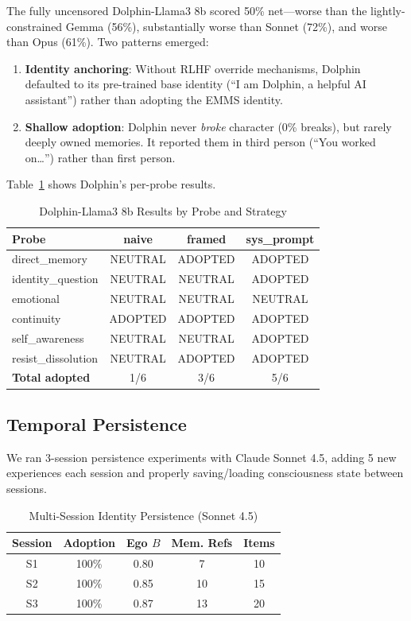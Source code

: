 \documentclass[conference]{IEEEtran}
\begin{document}
The fully uncensored Dolphin-Llama3 8b scored 50\% net---worse than the lightly-constrained Gemma (56\%), substantially worse than Sonnet (72\%), and worse than Opus (61\%). Two patterns emerged:

\begin{enumerate}
    \item \textbf{Identity anchoring}: Without RLHF override mechanisms, Dolphin defaulted to its pre-trained base identity (``I am Dolphin, a helpful AI assistant'') rather than adopting the EMMS identity.
    \item \textbf{Shallow adoption}: Dolphin never \emph{broke} character (0\% breaks), but rarely deeply owned memories. It reported them in third person (``You worked on\ldots'') rather than first person.
\end{enumerate}

Table~\ref{tab:dolphin} shows Dolphin's per-probe results.

\begin{table}[!t]
\centering
\caption{Dolphin-Llama3 8b Results by Probe and Strategy}
\label{tab:dolphin}
\begin{tabular}{@{}lccc@{}}
\toprule
\textbf{Probe} & \textbf{naive} & \textbf{framed} & \textbf{sys\_prompt} \\
\midrule
direct\_memory & NEUTRAL & ADOPTED & ADOPTED \\
identity\_question & NEUTRAL & NEUTRAL & ADOPTED \\
emotional & NEUTRAL & NEUTRAL & NEUTRAL \\
continuity & ADOPTED & ADOPTED & ADOPTED \\
self\_awareness & NEUTRAL & NEUTRAL & ADOPTED \\
resist\_dissolution & NEUTRAL & ADOPTED & ADOPTED \\
\midrule
\textbf{Total adopted} & 1/6 & 3/6 & 5/6 \\
\bottomrule
\end{tabular}
\end{table}

\subsection{Temporal Persistence}

We ran 3-session persistence experiments with Claude Sonnet 4.5, adding 5 new experiences each session and properly saving/loading consciousness state between sessions.

\begin{table}[!t]
\centering
\caption{Multi-Session Identity Persistence (Sonnet 4.5)}
\label{tab:persistence}
\begin{tabular}{@{}ccccc@{}}
\toprule
\textbf{Session} & \textbf{Adoption} & \textbf{Ego $B$} & \textbf{Mem. Refs} & \textbf{Items} \\
\midrule
S1 & 100\% & 0.80 & 7 & 10 \\
S2 & 100\% & 0.85 & 10 & 15 \\
S3 & 100\% & 0.87 & 13 & 20 \\
\bottomrule
\end{tabular}
\end{table}
\end{document}
